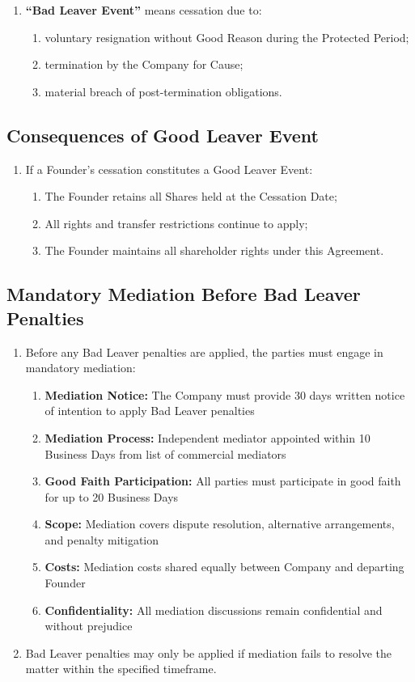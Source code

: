 \begin{enumerate}[label=(\alph*)]
\item \textbf{``Bad Leaver Event''} means cessation due to:
    \begin{enumerate}[label=(\roman*)]
    \item voluntary resignation without Good Reason during the Protected Period;
    \item termination by the Company for Cause;
    \item material breach of post-termination obligations.
    \end{enumerate}
\end{enumerate}

\subsection{Consequences of Good Leaver Event}
\begin{enumerate}[label=(\alph*)]
\item If a Founder's cessation constitutes a Good Leaver Event:
    \begin{enumerate}[label=(\roman*)]
    \item The Founder retains all Shares held at the Cessation Date;
    \item All rights and transfer restrictions continue to apply;
    \item The Founder maintains all shareholder rights under this Agreement.
    \end{enumerate}
\end{enumerate}

\subsection{Mandatory Mediation Before Bad Leaver Penalties}
\begin{enumerate}[label=(\alph*)]
\item Before any Bad Leaver penalties are applied, the parties must engage in mandatory mediation:
    \begin{enumerate}[label=(\roman*)]
    \item \textbf{Mediation Notice:} The Company must provide 30 days written notice of intention to apply Bad Leaver penalties
    \item \textbf{Mediation Process:} Independent mediator appointed within 10 Business Days from list of commercial mediators
    \item \textbf{Good Faith Participation:} All parties must participate in good faith for up to 20 Business Days
    \item \textbf{Scope:} Mediation covers dispute resolution, alternative arrangements, and penalty mitigation
    \item \textbf{Costs:} Mediation costs shared equally between Company and departing Founder
    \item \textbf{Confidentiality:} All mediation discussions remain confidential and without prejudice
    \end{enumerate}
\item Bad Leaver penalties may only be applied if mediation fails to resolve the matter within the specified timeframe.
\end{enumerate}

